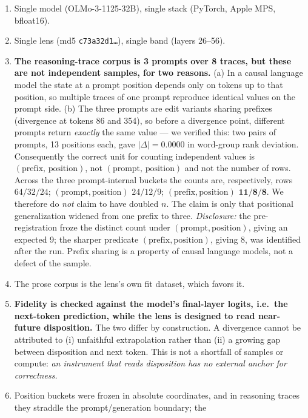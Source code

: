 \documentclass[11pt]{article}
\begin{document}
\begin{enumerate}\itemsep3pt
\item Single model (OLMo-3-1125-32B), single stack (PyTorch, Apple MPS,
  bfloat16).
\item Single lens (md5 \texttt{c73a32d1\ldots}), single band (layers
  26--56).
\item \textbf{The reasoning-trace corpus is 3 prompts over 8 traces, but
  these are not independent samples, for two reasons.} (a) In a causal
  language model the state at a prompt position depends only on tokens up
  to that position, so multiple traces of one prompt reproduce identical
  values on the prompt side. (b) The three prompts are edit variants
  sharing prefixes (divergence at tokens 86 and 354), so before a
  divergence point, different prompts return \emph{exactly} the same
  value --- we verified this: two pairs of prompts, 13 positions each,
  gave $|\Delta| = 0.0000$ in word-group rank deviation. Consequently the
  correct unit for counting independent values is
  $(\text{prefix},\,\text{position})$, not $(\text{prompt},\,
  \text{position})$ and not the number of rows. Across the three
  prompt-internal buckets the counts are, respectively, rows
  $64/32/24$; $(\text{prompt},\text{position})$ $24/12/9$;
  $(\text{prefix},\text{position})$ $\mathbf{11/8/8}$. We therefore do
  \emph{not} claim to have doubled $n$. The claim is only that positional
  generalization widened from one prefix to three. \emph{Disclosure:} the
  pre-registration froze the distinct count under
  $(\text{prompt},\text{position})$, giving an expected 9; the sharper
  predicate $(\text{prefix},\text{position})$, giving 8, was identified
  after the run. Prefix sharing is a property of causal language models,
  not a defect of the sample.
\item The prose corpus is the lens's own fit dataset, which favors it.
\item \textbf{Fidelity is checked against the model's final-layer logits,
  i.e.\ the next-token prediction, while the lens is designed to read
  near-future disposition.} The two differ by construction. A divergence
  cannot be attributed to (i) unfaithful extrapolation rather than (ii) a
  growing gap between disposition and next token. This is not a shortfall
  of samples or compute: \emph{an instrument that reads disposition has
  no external anchor for correctness.}
\item Position buckets were frozen in absolute coordinates, and in
  reasoning traces they straddle the prompt/generation boundary; the

\end{enumerate}
\end{document}
